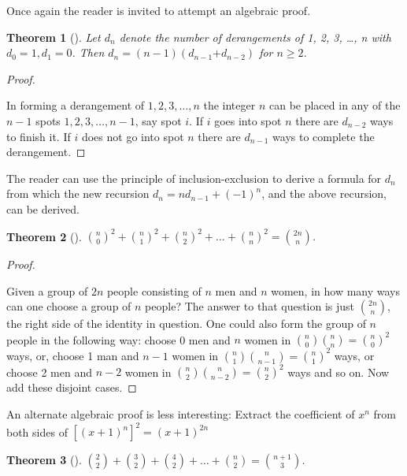 \documentclass[10pt,]{book}
\theoremstyle{plain}
\newtheorem{theorem}{Theorem}[section]
\theoremstyle{definition}
\theoremstyle{definition}
\numberwithin{equation}{chapter}
\begin{document}
\hypertarget{p-294}{}%
Once again the reader is invited to attempt an algebraic proof.%
\begin{theorem}[{}]\label{theorem-11}
\hypertarget{p-295}{}%
Let \(d_{n}\) denote the number of derangements of 1, 2, 3, \ldots, n with \(d_{0} = 1,d_{1} = 0\).  Then \(d_{n} = \left( n - 1 \right)(d_{n - 1}{+ d}_{n - 2})\) for \(n \geq 2\).%
\end{theorem}
\begin{proof}\hypertarget{proof-9}{}
\hypertarget{p-296}{}%
In forming a derangement of \(1, 2, 3, \ldots, n\) the integer \(n\) can be placed in any of the \(n - 1\) spots \(1, 2, 3, \ldots, n - 1\), say spot \(i\). If \(i\) goes into spot \(n\) there are \(d_{n - 2}\) ways to finish it. If \(i\) does not go into spot \(n\) there are \(d_{n - 1}\) ways to complete the derangement.%
\end{proof}
\hypertarget{p-297}{}%
The reader can use the principle of inclusion-exclusion to derive a formula for \(d_{n}\) from which the new recursion \(d_{n} = nd_{n - 1} + \left( - 1 \right)^{n}\), and the above recursion, can be derived.%
\begin{theorem}[{}]\label{theorem-12}
\hypertarget{p-298}{}%
\(\binom{n}{0}^{2} + \binom{n}{1}^{2} + \binom{n}{2}^{2} + \ldots + \binom{n}{n}^{2} = \binom{2n}{n}\).%
\end{theorem}
\begin{proof}\hypertarget{proof-10}{}
\hypertarget{p-299}{}%
Given a group of \(2n\) people consisting of \(n\) men and \(n\) women, in how many ways can one choose a group of \(n\) people? The answer to that question is just \(\binom{2n}{n}\), the right side of the identity in question. One could also form the group of \(n\) people in the following way: choose 0 men and \(n\) women in \(\binom{n}{0} \binom{n}{n} = \binom{n}{0}^{2}\) ways, or, choose 1 man and \(n - 1\) women in \(\binom{n}{1} \binom{n}{n - 1} = \binom{n}{1}^{2}\) ways, or choose 2 men and \(n - 2\) women in \(\binom{n}{2} \binom{n}{n - 2} = \binom{n}{2}^{2}\) ways and so on. Now add these disjoint cases.%
\end{proof}
\hypertarget{p-300}{}%
An alternate algebraic proof is less interesting: Extract the coefficient of \(x^{n}\) from both sides of \(\left\lbrack \left( x + 1 \right)^{n} \right\rbrack^{2} = \left(x + 1 \right)^{2n}\)%
\begin{theorem}[{}]\label{theorem-13}
\hypertarget{p-301}{}%
\(\binom{2}{2} + \binom{3}{2} + \binom{4}{2} + \ldots + \binom{n}{2} = \binom{n + 1}{3}\).%
\end{theorem}
\end{document}
